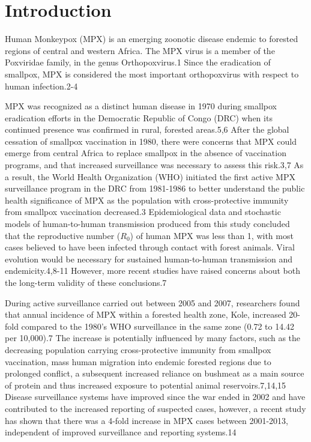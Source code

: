 \section{Introduction}
Human Monkeypox (MPX) is an emerging zoonotic disease endemic to forested regions of central and western Africa. The MPX virus is a member of the Poxviridae family, in the genus Orthopoxvirus.1 Since the eradication of smallpox, MPX is considered the most important orthopoxvirus with respect to human infection.2-4 

MPX was recognized as a distinct human disease in 1970 during smallpox eradication efforts in the Democratic Republic of Congo (DRC) when its continued presence was confirmed in rural, forested areas.5,6 After the global cessation of smallpox vaccination in 1980, there were concerns that MPX could emerge from central Africa to replace smallpox in the absence of vaccination programs, and that increased surveillance was necessary to assess this risk.3,7 As a result, the World Health Organization (WHO) initiated the first active MPX surveillance program in the DRC from 1981-1986 to better understand the public health significance of MPX as the population with cross-protective immunity from smallpox vaccination decreased.3 Epidemiological data and stochastic models of human-to-human transmission produced from this study concluded that the reproductive number ($R_{0}$) of human MPX was less than 1, with most cases believed to have been infected through contact with forest animals. Viral evolution would be necessary for sustained human-to-human transmission and endemicity.4,8-11 However, more recent studies have raised concerns about both the long-term validity of these conclusions.7 

During active surveillance carried out between 2005 and 2007, researchers found that annual incidence of MPX within a forested health zone, Kole, increased 20-fold compared to the 1980’s WHO surveillance in the same zone (0.72 to 14.42 per 10,000).7 The increase is potentially influenced by many factors, such as the decreasing population carrying cross-protective immunity from smallpox vaccination, mass human migration into endemic forested regions due to prolonged conflict, a subsequent increased reliance on bushmeat as a main source of protein and thus increased exposure to potential animal reservoirs.7,14,15 Disease surveillance systems have improved since the war ended in 2002 and have contributed to the increased reporting of suspected cases, however, a recent study has shown that there was a 4-fold increase in MPX cases between 2001-2013, independent of improved surveillance and reporting systems.14 


